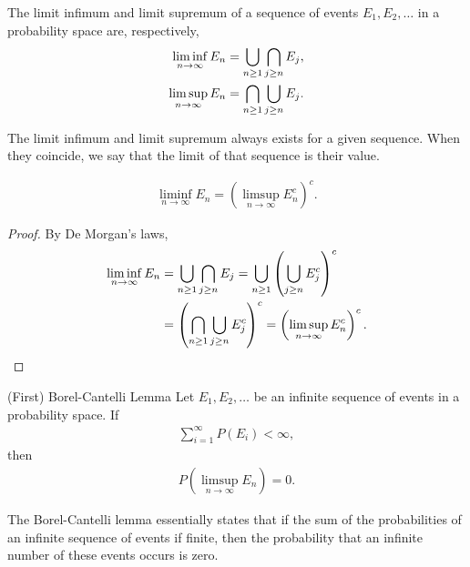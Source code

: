 \begin{defn}
    The limit infimum and limit supremum of a sequence of events $E_1, E_2, \ldots$ in a probability space are, respectively,
    \begin{align*}
        \liminf_{n \to \infty}E_n = \bigcup_{n \geq 1}\bigcap_{j \geq n}E_j, \\
        \limsup_{n \to \infty}E_n = \bigcap_{n \geq 1}\bigcup_{j \geq n}E_j.
    \end{align*}

    The limit infimum and limit supremum always exists for a given sequence. When they coincide, we say that the limit of that sequence is their value.
\end{defn}

\begin{prop}\label{set-infimum-supremum-complement}
    \begin{align*}
        \liminf_{n \to \infty}E_n = \left(\limsup_{n \to \infty}E_n^{c}\right)^{c}.
    \end{align*}
\end{prop}

\begin{proof}
    By De Morgan's laws,
    \begin{align*}
        \liminf_{n \to \infty}E_n &= \bigcup_{n \geq 1}\bigcap_{j \geq n}E_j = \bigcup_{n \geq 1}\left(\bigcup_{j \geq n}E_j^{c}\right)^{c} \\
        &= \left(\bigcap_{n \geq 1}\bigcup_{j \geq n}E_j^{c}\right)^{c} = \left(\limsup_{n \to \infty}E_n^{c}\right)^{c}.
    \end{align*}
\end{proof}

\begin{lemma}{(First) Borel-Cantelli Lemma}\label{borel-cantelli}\proofbreak
    Let $E_1, E_2, \ldots$ be an infinite sequence of events in a probability space. If
    \begin{align*}
        \sum_{i=1}^{\infty}P(E_i) < \infty,
    \end{align*}
    then
    \begin{align*}
        P\left(\limsup_{n \to \infty}E_n\right) = 0.
    \end{align*}
\end{lemma}

\begin{rmk}
    The Borel-Cantelli lemma essentially states that if the sum of the probabilities of an infinite sequence of events if finite, then the probability that an infinite number of these events occurs is zero.
\end{rmk}

